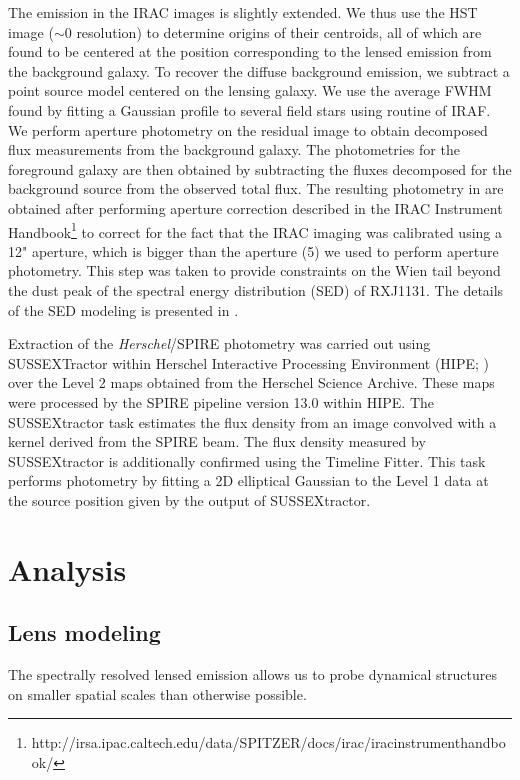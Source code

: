 \documentclass[]{emulateapj}
\begin{document}
The emission in the IRAC images is slightly extended. We thus use the
HST image ($\sim$0 resolution) to determine
origins of their centroids, all of which are found to be
centered at the position corresponding to the lensed emission from the
background galaxy. To recover the diffuse background emission, we subtract a
point source model centered on the lensing galaxy. We use the average
FWHM found by fitting a Gaussian profile to several field stars
using  routine of IRAF.
We perform aperture photometry on the residual image
to obtain decomposed flux measurements from the background galaxy.
The photometries for the foreground galaxy are then obtained
by subtracting the fluxes decomposed for the background source
from the observed total flux. The resulting photometry in
 are obtained after performing aperture correction
described in the IRAC Instrument Handbook\footnote{http://irsa.ipac.caltech.edu/data/SPITZER/docs/irac/iracinstrumenthandbook/} to
correct for the fact that the IRAC imaging was calibrated
using a 12" aperture, which is bigger than the aperture (5) we used to
perform aperture photometry. This step was taken to provide
constraints on the Wien tail beyond the dust peak of the
spectral energy distribution (SED) of RXJ1131.
The details of the SED modeling is presented in .

Extraction of the {\it Herschel}/SPIRE photometry was
carried out using SUSSEXTractor within Herschel Interactive
Processing Environment (HIPE; \citealt{Ott10a})
over the Level 2 maps obtained from the Herschel Science Archive.
These maps were processed by the SPIRE pipeline
version 13.0 within HIPE. The SUSSEXtractor task estimates
the flux density from an image convolved with a kernel
derived from the SPIRE beam. The flux density
measured by SUSSEXtractor is additionally confirmed
using the Timeline Fitter. This task performs photometry
by fitting a 2D elliptical Gaussian to the Level 1 data at the
source position given by the output of SUSSEXtractor.



\section{Analysis}
\subsection{Lens modeling} \label{lensmodel}
The spectrally resolved lensed emission allows us to probe dynamical structures on smaller spatial scales than otherwise possible.
\end{document}
